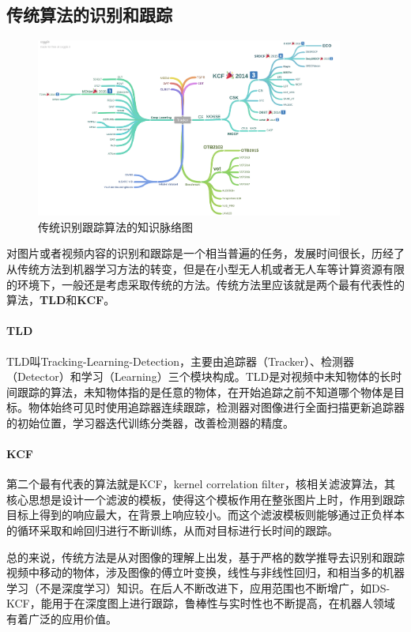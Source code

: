 \documentclass[lang=cn,11pt,a4paper]{elegant_template}
\begin{document}
\subsection{传统算法的识别和跟踪}
\begin{figure}[htbp]
  \centering
  \includegraphics[width=0.9\textwidth]{image/cv_1.png}
  \caption{传统识别跟踪算法的知识脉络图}
\end{figure}

对图片或者视频内容的识别和跟踪是一个相当普遍的任务，发展时间很长，历经了从传统方法到机器学习方法的转变，但是在小型无人机或者无人车等计算资源有限的环境下，一般还是考虑采取传统的方法。传统方法里应该就是两个最有代表性的算法，\textbf{TLD}和\textbf{KCF}。

\paragraph{TLD} TLD叫Tracking-Learning-Detection，主要由追踪器（Tracker）、检测器（Detector）和学习（Learning）三个模块构成。TLD是对视频中未知物体的长时间跟踪的算法，未知物体指的是任意的物体，在开始追踪之前不知道哪个物体是目标。物体始终可见时使用追踪器连续跟踪，检测器对图像进行全面扫描更新追踪器的初始位置，学习器迭代训练分类器，改善检测器的精度。

\paragraph{KCF} 第二个最有代表的算法就是KCF，kernel correlation filter，核相关滤波算法，其核心思想是设计一个滤波的模板，使得这个模板作用在整张图片上时，作用到跟踪目标上得到的响应最大，在背景上响应较小。而这个滤波模板则能够通过正负样本的循环采取和岭回归进行不断训练，从而对目标进行长时间的跟踪。
 
\hfill 
 
总的来说，传统方法是从对图像的理解上出发，基于严格的数学推导去识别和跟踪视频中移动的物体，涉及图像的傅立叶变换，线性与非线性回归，和相当多的机器学习（不是深度学习）知识。在后人不断改进下，应用范围也不断增广，如DS-KCF，能用于在深度图上进行跟踪，鲁棒性与实时性也不断提高，在机器人领域有着广泛的应用价值。
\end{document}
